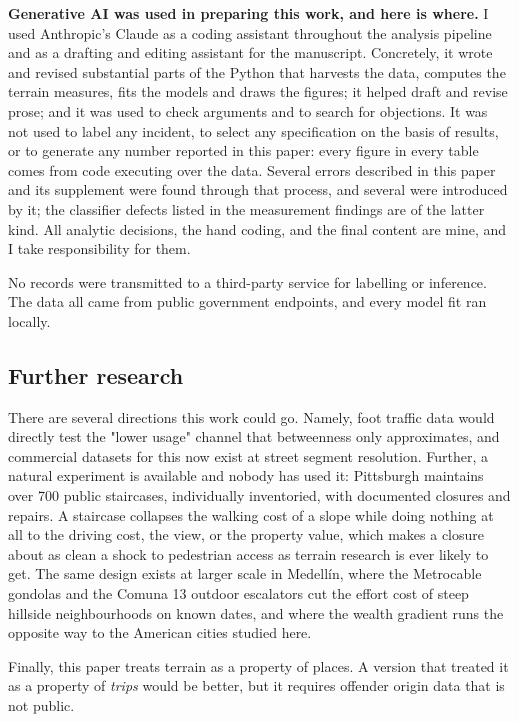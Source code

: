 \documentclass[10pt,letterpaper]{article}
\begin{document}
\textbf{Generative AI was used in preparing this work, and here is where.} I used
Anthropic's Claude as a coding assistant throughout the analysis pipeline and as a
drafting and editing assistant for the manuscript. Concretely, it wrote and revised
substantial parts of the Python that harvests the data, computes the terrain
measures, fits the models and draws the figures; it helped draft and revise prose;
and it was used to check arguments and to search for objections. It was not used to
label any incident, to select any specification on the basis of results, or to
generate any number reported in this paper: every figure in every table comes from
code executing over the data. Several errors described in this paper and its
supplement were found through that process, and several were introduced by it; the
classifier defects listed in the measurement findings are of the latter kind. All
analytic decisions, the hand coding, and the final content are mine, and I take
responsibility for them.

No records were transmitted to a third-party service for labelling or inference. The
data all came from public government endpoints, and every model fit ran locally.


\subsection*{Further research}

There are several directions this work could go. Namely, foot traffic data would
directly test the "lower usage" channel that betweenness only approximates, and
commercial datasets for this now exist at street segment resolution. Further, a
natural experiment is available and nobody has used it: Pittsburgh maintains over 700
public staircases, individually inventoried, with documented closures and repairs.
A staircase collapses the walking cost of a slope while doing nothing at all to the
driving cost, the view, or the property value, which makes a closure about as clean a
shock to pedestrian access as terrain research is ever likely to get. The same design
exists at larger scale in Medellín, where the Metrocable gondolas and the Comuna 13
outdoor escalators cut the effort cost of steep hillside neighbourhoods on known dates,
and where the wealth gradient runs the opposite way to the American cities studied
here.

Finally, this paper treats terrain as a property of places. A version that treated it
as a property of \emph{trips} would be better, but it requires offender origin data
that is not public.
\end{document}

